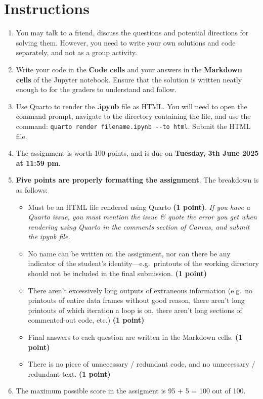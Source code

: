 \documentclass[
  letterpaper,
  DIV=11,
  numbers=noendperiod]{scrreprt}
\providecommand{\tightlist}{%
  \setlength{\itemsep}{0pt}\setlength{\parskip}{0pt}}\usepackage{longtable,booktabs,array}
\begin{document}
\section*{Instructions}\label{instructions-4}


\begin{enumerate}
\def\labelenumi{\arabic{enumi}.}
\item
  You may talk to a friend, discuss the questions and potential
  directions for solving them. However, you need to write your own
  solutions and code separately, and not as a group activity.
\item
  Write your code in the \textbf{Code cells} and your answers in the
  \textbf{Markdown cells} of the Jupyter notebook. Ensure that the
  solution is written neatly enough to for the graders to understand and
  follow.
\item
  Use
  \href{https://quarto.org/docs/output-formats/html-basics.html}{Quarto}
  to render the \textbf{.ipynb} file as HTML. You will need to open the
  command prompt, navigate to the directory containing the file, and use
  the command: \texttt{quarto\ render\ filename.ipynb\ -\/-to\ html}.
  Submit the HTML file.
\item
  The assignment is worth 100 points, and is due on \textbf{Tuesday, 3th
  June 2025 at 11:59 pm}.
\item
  \textbf{Five points are properly formatting the assignment}. The
  breakdown is as follows:

  \begin{itemize}
  \tightlist
  \item
    Must be an HTML file rendered using Quarto \textbf{(1 point)}.
    \emph{If you have a Quarto issue, you must mention the issue \&
    quote the error you get when rendering using Quarto in the comments
    section of Canvas, and submit the ipynb file.}
  \item
    No name can be written on the assignment, nor can there be any
    indicator of the student's identity---e.g.~printouts of the working
    directory should not be included in the final submission. \textbf{(1
    point)}
  \item
    There aren't excessively long outputs of extraneous information
    (e.g.~no printouts of entire data frames without good reason, there
    aren't long printouts of which iteration a loop is on, there aren't
    long sections of commented-out code, etc.) \textbf{(1 point)}
  \item
    Final answers to each question are written in the Markdown cells.
    \textbf{(1 point)}
  \item
    There is no piece of unnecessary / redundant code, and no
    unnecessary / redundant text. \textbf{(1 point)}
  \end{itemize}
\item
  The maximum possible score in the assigment is 95 + 5 = 100 out of
  100.
\end{enumerate}
\end{document}
